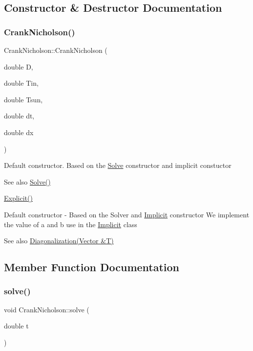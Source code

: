 \subsection{Constructor \& Destructor Documentation}
\mbox{\label{class_crank_nicholson_a77c284d244c4c0aabcd2b7d35efc356e}} 
\subsubsection{\texorpdfstring{Crank\+Nicholson()}{CrankNicholson()}}
{\footnotesize\ttfamily Crank\+Nicholson\+::\+Crank\+Nicholson (\begin{DoxyParamCaption}\item[{double}]{D,  }\item[{double}]{Tin,  }\item[{double}]{Tsun,  }\item[{double}]{dt,  }\item[{double}]{dx }\end{DoxyParamCaption})}

Default constructor. Based on the \hyperlink{class_solve}{Solve} constructor and implicit constuctor \begin{DoxySeeAlso}{See also}
\hyperlink{class_solve_a1e0efad6dcf6b09759dd38df7aa08db8}{Solve()} 

\hyperlink{class_explicit}{Explicit()}
\end{DoxySeeAlso}
Default constructor -\/ Based on the Solver and \hyperlink{class_implicit}{Implicit} constructor We implement the value of a and b use in the \hyperlink{class_implicit}{Implicit} class \begin{DoxySeeAlso}{See also}
\hyperlink{class_implicit_a572fff2232977c83c432f993f37a7853}{Diagonalization(\+Vector \&\+T)} 
\end{DoxySeeAlso}


\subsection{Member Function Documentation}
\mbox{\label{class_crank_nicholson_a999d04c6ef97b0794f66584f9192dbee}} 
\subsubsection{\texorpdfstring{solve()}{solve()}}
{\footnotesize\ttfamily void Crank\+Nicholson\+::solve (\begin{DoxyParamCaption}\item[{double}]{t }\end{DoxyParamCaption})\hspace{0.3cm}{\ttfamily [virtual]}}

